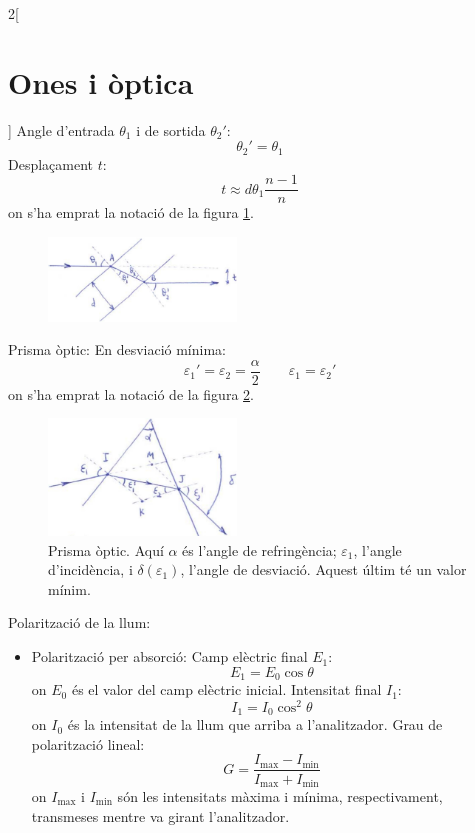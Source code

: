\documentclass[class=article,10pt,crop=false]{standalone}
\begin{document}
\begin{multicols}{2}[\section{Ones i òptica}]
Angle d'entrada $\theta_1$ i de sortida $\theta_2'$: $$\theta_2'=\theta_1$$
Desplaçament $t$: $$t\approx d\theta_1\frac{n-1}{n}$$
{\footnotesize on s'ha emprat la notació de la figura \ref{plano}.}\newline
\begin{figure}
    \includegraphics[width=5cm]{Physics/1st/Ones_i_optica/Imatges/plano.jpg} 
    \caption{}
    \label{plano}
\end{figure}
Prisma òptic: \newline
En desviació mínima: $$\varepsilon_1'=\varepsilon_2=\frac{\alpha}{2}\qquad\varepsilon_1=\varepsilon_2'$$ {\footnotesize on s'ha emprat la notació de la figura \ref{pris}.}\newline
\begin{figure}
    \includegraphics[width=5cm]{Physics/1st/Ones_i_optica/Imatges/prisma.jpg} 
    \caption{Prisma òptic. Aquí $\alpha$ és l'angle de refringència; $\varepsilon_1$, l'angle d'incidència, i $\delta(\varepsilon_1)$, l'angle de desviació. Aquest últim té un valor mínim.}
    \label{pris}
\end{figure}
Polarització de la llum:
\begin{itemize}
    \item Polarització per absorció:\newline
    Camp elèctric final $E_1$:
    \begin{equation*}
        E_1=E_0\cos\theta
    \end{equation*}
    {\footnotesize on $E_0$ és el valor del camp elèctric inicial.}
    Intensitat final $I_1$:
    \begin{equation*}
        I_1=I_0\cos^2\theta
    \end{equation*}
    {\footnotesize on $I_0$ és la intensitat de la llum que arriba a l'analitzador.}\newline
    Grau de polarització lineal: $$G=\frac{I_{\text{max}}-I_{\text{min}}}{I_{\text{max}}+I_{\text{min}}}$$ {\footnotesize on $I_{\text{max}}$ i $I_{\text{min}}$ són les intensitats màxima i mínima, respectivament, transmeses mentre va girant l'analitzador.}\newline

\end{itemize}
\end{multicols}
\end{document}
